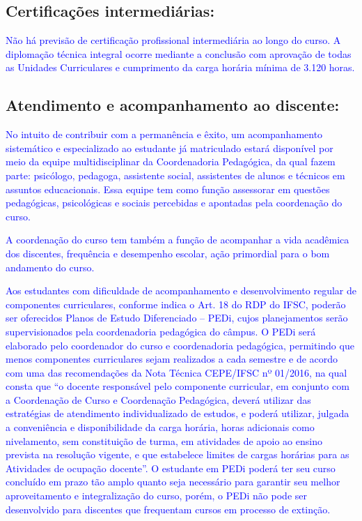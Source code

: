 \documentclass{../../modelos/latex-shared/ifsc-ppc}
\newcommand{\revisao}[1]{\textcolor{blue}{#1}}
\newcommand{\revisao}[1]{#1}
\begin{document}
\subsection{Certificações intermediárias:}
\revisao{Não há previsão de certificação profissional intermediária ao longo do curso. A diplomação técnica integral ocorre mediante a conclusão com aprovação de todas as Unidades Curriculares e cumprimento da carga horária mínima de 3.120 horas.}

\subsection{Atendimento e acompanhamento ao discente:}
\revisao{No intuito de contribuir com a permanência e êxito, um acompanhamento sistemático e especializado ao estudante já matriculado estará disponível por meio da equipe multidisciplinar da Coordenadoria Pedagógica, da qual fazem parte: psicólogo, pedagoga, assistente social, assistentes de alunos e técnicos em assuntos educacionais. Essa equipe tem como função assessorar em questões pedagógicas, psicológicas e sociais percebidas e apontadas pela coordenação do curso.}

\revisao{A coordenação do curso tem também a função de acompanhar a vida acadêmica dos discentes, frequência e desempenho escolar, ação primordial para o bom andamento do curso.}

\revisao{Aos estudantes com dificuldade de acompanhamento e desenvolvimento regular de componentes curriculares, conforme indica o Art. 18 do RDP do IFSC, poderão ser oferecidos Planos de Estudo Diferenciado -- PEDi, cujos planejamentos serão supervisionados pela coordenadoria pedagógica do câmpus. O PEDi será elaborado pelo coordenador do curso e coordenadoria pedagógica, permitindo que menos componentes curriculares sejam realizados a cada semestre e de acordo com uma das recomendações da Nota Técnica CEPE/IFSC nº 01/2016, na qual consta que ``o docente responsável pelo componente curricular, em conjunto com a Coordenação de Curso e Coordenação Pedagógica, deverá utilizar das estratégias de atendimento individualizado de estudos, e poderá utilizar, julgada a conveniência e disponibilidade da carga horária, horas adicionais como nivelamento, sem constituição de turma, em atividades de apoio ao ensino prevista na resolução vigente, e que estabelece limites de cargas horárias para as Atividades de ocupação docente''. O estudante em PEDi poderá ter seu curso concluído em prazo tão amplo quanto seja necessário para garantir seu melhor aproveitamento e integralização do curso, porém, o PEDi não pode ser desenvolvido para discentes que frequentam cursos em processo de extinção.}
\end{document}

